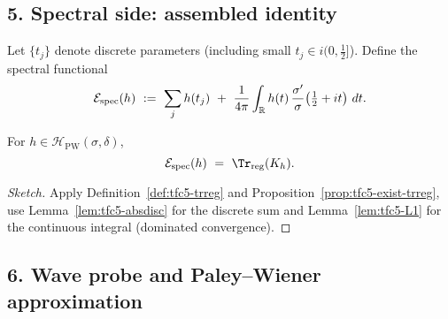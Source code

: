 \subsection*{5. Spectral side: assembled identity}\relax\hspace{0pt}
\label{subsec:tfc5-assembled} %

Let $\{t_j\}$ denote discrete parameters (including small $t_j\in i(0,\frac12]$). \relax\hspace{0pt}
Define the spectral functional
\begin{equation}\relax\hspace{0pt}
\label{eq:tfc5-Espec}\relax\hspace{0pt}
\mathcal{E}_{\mathrm{spec}}(h)\ :=\ \sum_{j} h(t_j)\ +\ \frac{1}{4\pi}\int_{\mathbb{R}} h(t)\,\frac{\sigma'}{\sigma}\!\left(\tfrac12+it\right)\,dt.
\end{equation}

\begin{theorem}\relax\hspace{0pt}
\label{thm:tfc5-spec=trreg} %
For $h\in\mathcal{H}_{\mathrm{PW}}(\sigma,\delta)$,
\begin{equation}\relax\hspace{0pt}
\label{eq:tfc5-spec-trreg}\relax\hspace{0pt}
\mathcal{E}_{\mathrm{spec}}(h)\ =\ \Tr_{\mathrm{reg}}(K_h).
\end{equation}
\end{theorem}

\begin{proof}[Sketch]\relax\hspace{0pt}
Apply Definition~\ref{def:tfc5-trreg} and Proposition~\ref{prop:tfc5-exist-trreg}, use Lemma~\ref{lem:tfc5-absdisc} for the discrete sum and Lemma~\ref{lem:tfc5-L1} for the continuous integral (dominated convergence). \relax\hspace{0pt}
\end{proof}

\subsection*{6. Wave probe and Paley--Wiener approximation}\relax\hspace{0pt}
\label{subsec:tfc5-wave} %

